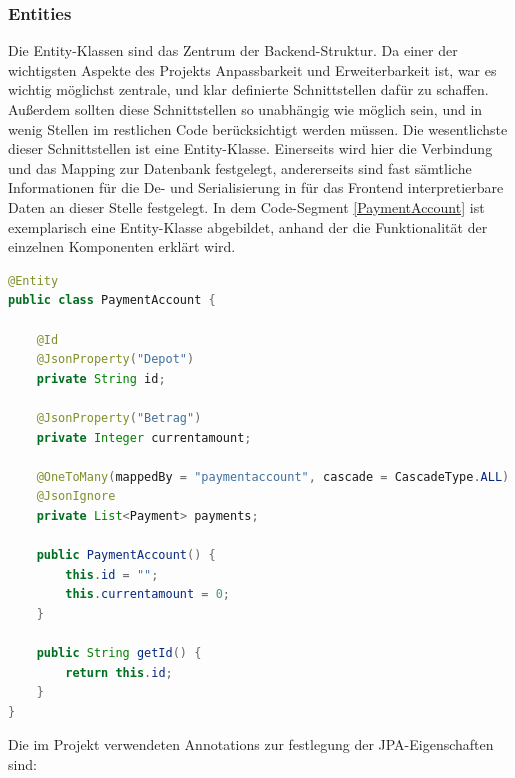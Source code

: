 \FloatBarrier
\subsubsection{Entities}

Die Entity-Klassen sind das Zentrum der Backend-Struktur. Da einer der wichtigsten Aspekte des Projekts Anpassbarkeit und Erweiterbarkeit ist, war es wichtig möglichst zentrale, und klar definierte Schnittstellen dafür zu schaffen. Außerdem sollten diese Schnittstellen so unabhängig wie möglich sein, und in wenig Stellen im restlichen Code berücksichtigt werden müssen. Die wesentlichste dieser Schnittstellen ist eine Entity-Klasse. Einerseits wird hier die Verbindung und das Mapping zur Datenbank festgelegt, andererseits sind fast sämtliche Informationen für die De- und Serialisierung in für das Frontend interpretierbare Daten an dieser Stelle festgelegt. In dem Code-Segment \ref{PaymentAccount} ist exemplarisch eine Entity-Klasse abgebildet, anhand der die Funktionalität der einzelnen Komponenten erklärt wird.

\footnotesize
\begin{lstlisting}[caption=PaymentAccount.java, label=PaymentAccount, language=Java]
@Entity
public class PaymentAccount {

	@Id
	@JsonProperty("Depot")
	private String id;
	
	@JsonProperty("Betrag")
	private Integer currentamount;
	
	@OneToMany(mappedBy = "paymentaccount", cascade = CascadeType.ALL)
	@JsonIgnore
	private List<Payment> payments;
	
	public PaymentAccount() {
		this.id = "";
		this.currentamount = 0;
	}
	
	public String getId() { 
		return this.id; 
	}
}
\end{lstlisting}
\normalsize


Die im Projekt verwendeten Annotations zur festlegung der JPA-Eigenschaften sind:

